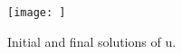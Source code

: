 \begin{figure}[ht]
\centering
\texttt{[image: ]}
\caption{Initial and final solutions of u.}
\end{figure}
